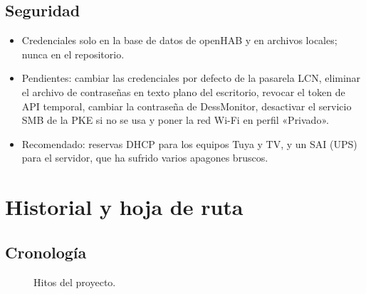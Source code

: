 \documentclass[11pt,a4paper]{report}
\begin{document}
\section{Seguridad}
\begin{itemize}[nosep]
  \item Credenciales solo en la base de datos de openHAB y en archivos locales; nunca en el repositorio.
  \item Pendientes: cambiar las credenciales por defecto de la pasarela LCN, eliminar el archivo de
        contraseñas en texto plano del escritorio, revocar el token de API temporal, cambiar la contraseña
        de DessMonitor, desactivar el servicio SMB de la PKE si no se usa y poner la red Wi-Fi en perfil
        «Privado».
  \item Recomendado: reservas DHCP para los equipos Tuya y TV, y un SAI (UPS) para el servidor, que ha
        sufrido varios apagones bruscos.
\end{itemize}

\chapter{Historial y hoja de ruta}

\section{Cronología}
\begin{figure}[H]
\centering
{}
\caption{Hitos del proyecto.}
\end{figure}
\end{document}
